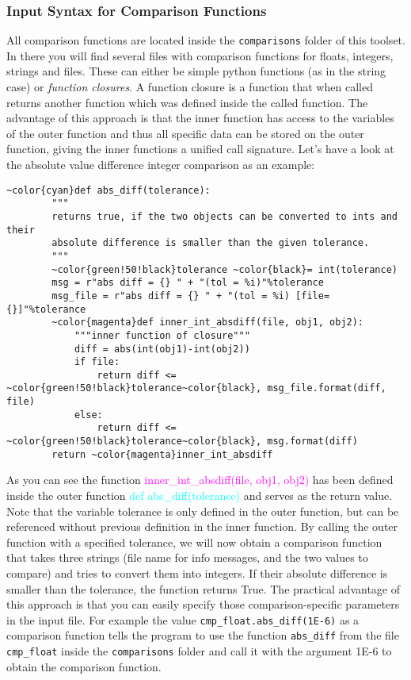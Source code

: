 \documentclass[a4paper,12pt]{scrartcl}
\begin{document}
\subsubsection*{Input Syntax for Comparison Functions}\label{closures}
All comparison functions are located inside the \texttt{comparisons} folder of this toolset. In there you will find
several files with comparison functions for floats, integers, strings and files. These can either be simple python
functions (as in the string case) or \textit{function closures}. A function closure is a function that when called
returns another function which was defined inside the called function. The advantage of this approach is that the
inner function has access to the variables of the outer function and thus all specific data can be stored on the
outer function, giving the inner functions a unified call signature. Let's have a look at the absolute value
difference integer comparison as an example:
\begin{Verbatim}[commandchars=~\{\},gobble=4, frame=single, framesep=2mm, label=cmp\_int.abs\_diff,
labelposition=bottomline]
    ~color{cyan}def abs_diff(tolerance):
        """
        returns true, if the two objects can be converted to ints and their
        absolute difference is smaller than the given tolerance.
        """
        ~color{green!50!black}tolerance ~color{black}= int(tolerance)
        msg = r"abs diff = {} " + "(tol = %i)"%tolerance
        msg_file = r"abs diff = {} " + "(tol = %i) [file={}]"%tolerance
        ~color{magenta}def inner_int_absdiff(file, obj1, obj2):
            """inner function of closure"""
            diff = abs(int(obj1)-int(obj2))
            if file:
                return diff <= ~color{green!50!black}tolerance~color{black}, msg_file.format(diff, file)
            else:
                return diff <= ~color{green!50!black}tolerance~color{black}, msg.format(diff)
        return ~color{magenta}inner_int_absdiff
\end{Verbatim}
As you can see the function \textcolor{magenta}{inner\_int\_absdiff(file, obj1, obj2)} has been defined inside the
outer function \textcolor{cyan}{def abs\_diff(tolerance)} and serves as the return value. Note that the variable
\textcolor{green!50!black}{tolerance} is only defined in the outer function, but can be referenced without previous
definition in the inner function. By calling the outer function with a specified tolerance, we will now obtain a
comparison function that takes three strings (file name for info messages, and the two values to compare) and tries
to convert them into integers. If their absolute difference is smaller than the tolerance, the function returns True.
The practical advantage of this approach is that you can easily specify those comparison-specific parameters in the
input file. For example the value \texttt{cmp\_float.abs\_diff(1E-6)} as a comparison function tells the program to
use the function \texttt{abs\_diff} from the file \texttt{cmp\_float} inside the \texttt{comparisons} folder and call
it with the argument 1E-6 to obtain the comparison function.
\end{document}
